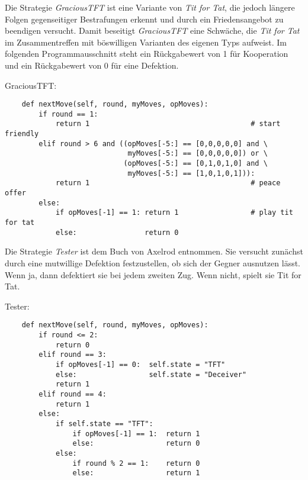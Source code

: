 \documentclass[12pt,a4paper,ngerman]{article}
\begin{document}
Die Strategie {\em GraciousTFT} ist eine Variante von {\em Tit for
  Tat}, die jedoch längere Folgen gegenseitiger Bestrafungen erkennt
und durch ein Friedensangebot zu beendigen versucht. Damit beseitigt
{\em GraciousTFT} eine Schwäche, die {\em Tit for Tat} im
Zusammentreffen mit böswilligen Varianten des eigenen Typs
aufweist. Im folgenden Programmausschnitt steht ein Rückgabewert von 1
für Kooperation und ein Rückgabewert von 0 für eine Defektion.

\begin{scriptsize}
\begin{samepage}
\begin{center}GraciousTFT:\end{center}
\begin{verbatim}
    def nextMove(self, round, myMoves, opMoves):
        if round == 1:
            return 1                                      # start friendly
        elif round > 6 and ((opMoves[-5:] == [0,0,0,0,0] and \
                             myMoves[-5:] == [0,0,0,0,0]) or \
                            (opMoves[-5:] == [0,1,0,1,0] and \
                             myMoves[-5:] == [1,0,1,0,1])):
            return 1                                      # peace offer
        else:
            if opMoves[-1] == 1: return 1                 # play tit for tat
            else:                return 0
\end{verbatim}
\end{samepage}
\end{scriptsize}

Die Strategie {\em Tester} ist dem Buch von Axelrod entnommen. Sie versucht
zunächst durch eine mutwillige Defektion festzustellen, ob sich der Gegner
ausnutzen lässt. Wenn ja, dann defektiert sie bei jedem zweiten Zug. Wenn nicht,
spielt sie Tit for Tat.

\begin{scriptsize}
\begin{center}Tester:\end{center}
\begin{verbatim}
    def nextMove(self, round, myMoves, opMoves):
        if round <= 2:
            return 0                                      
        elif round == 3:
            if opMoves[-1] == 0:  self.state = "TFT"
            else:                 self.state = "Deceiver"
            return 1
        elif round == 4:
            return 1
        else:
            if self.state == "TFT":
                if opMoves[-1] == 1:  return 1
                else:                 return 0
            else:
                if round % 2 == 1:    return 0
                else:                 return 1

\end{verbatim}
\end{scriptsize}
\end{document}
